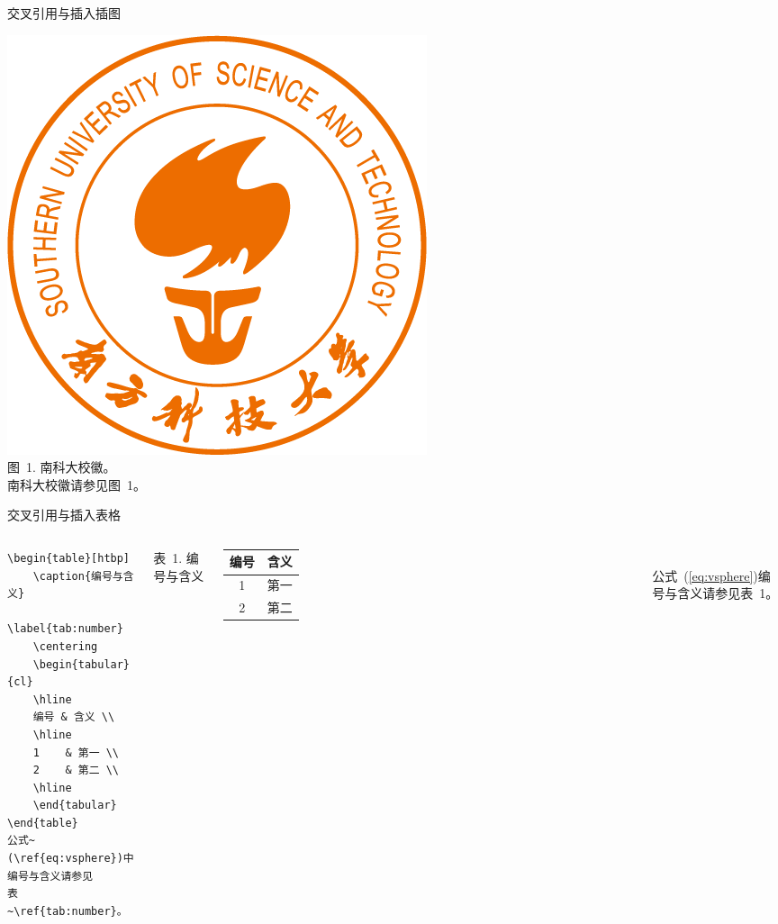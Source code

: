 \begin{frame}[fragile]{交叉引用与插入插图}
\begin{minipage}{0.3\linewidth}
        \includegraphics[height=0.2\textheight]{LOGO.png}\\
        {\footnotesize\heiti 图~1. 南科大校徽。}\\
        {\songti 南科大校徽请参见图~1。}\\[1em]
    \end{minipage}
\end{frame}

\begin{frame}[fragile]{交叉引用与插入表格}
    \begin{columns}
        \lstset{language=[LaTeX]TeX}
        \begin{lstlisting}
\begin{table}[htbp]
    \caption{编号与含义}
    \label{tab:number}
    \centering
    \begin{tabular}{cl}
    \hline
    编号 & 含义 \\
    \hline
    1    & 第一 \\
    2    & 第二 \\
    \hline
    \end{tabular}
\end{table}
公式~(\ref{eq:vsphere})中编号与含义请参见
表~\ref{tab:number}。\end{lstlisting}
        \centering
        {\small 表~1. 编号与含义}\\[2pt]
        \begin{tabular}{cl}\hline
            编号 & 含义 \\\hline
            1  & 第一 \\
            2  & 第二 \\\hline
        \end{tabular}\\[5pt]

        \normalsize 公式~(\ref{eq:vsphere})编号与含义请参见表~1。
    \end{columns}
\end{frame}

